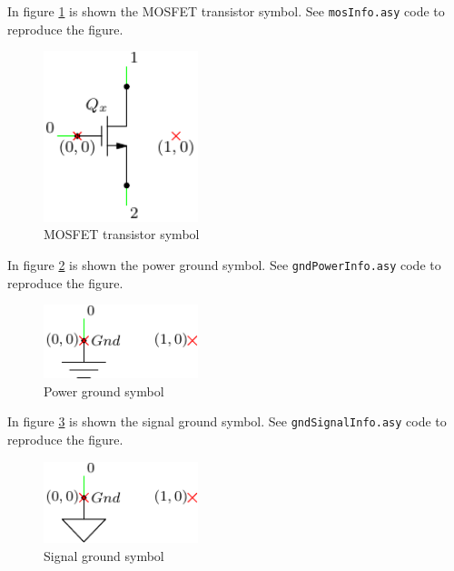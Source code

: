 \documentclass[a4paper,12pt]{report}
\begin{document}
In figure \ref{mosInfo} is shown the MOSFET transistor symbol. See \texttt{mosInfo.asy} code to reproduce the figure.

\begin{figure}[ht]
\centering
\includegraphics[width=0.4\textwidth]{mosInfo}
\caption{MOSFET transistor symbol}
\label{mosInfo}
\end{figure}

In figure \ref{gndPowerInfo} is shown the power ground symbol. See \texttt{gndPowerInfo.asy} code to reproduce the figure.

\begin{figure}[ht]
\centering
\includegraphics[width=0.4\textwidth]{gndPowerInfo}
\caption{Power ground symbol}
\label{gndPowerInfo}
\end{figure}

In figure \ref{gndSignalInfo} is shown the signal ground symbol. See \texttt{gndSignalInfo.asy} code to reproduce the figure.

\begin{figure}[ht]
\centering
\includegraphics[width=0.4\textwidth]{gndSignalInfo}
\caption{Signal ground symbol}
\label{gndSignalInfo}
\end{figure}

\clearpage
\end{document}
